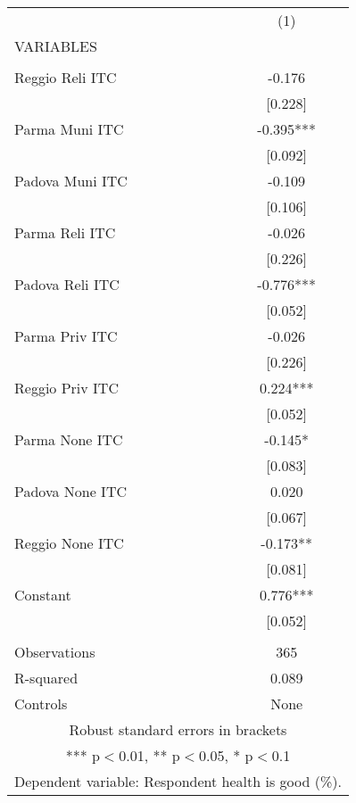 \begin{tabular}{lc} \hline
 & (1) \\
VARIABLES &  \\ \hline
 &  \\
Reggio Reli ITC & -0.176 \\
 & [0.228] \\
Parma Muni ITC & -0.395*** \\
 & [0.092] \\
Padova Muni ITC & -0.109 \\
 & [0.106] \\
Parma Reli ITC & -0.026 \\
 & [0.226] \\
Padova Reli ITC & -0.776*** \\
 & [0.052] \\
Parma Priv ITC & -0.026 \\
 & [0.226] \\
Reggio Priv ITC & 0.224*** \\
 & [0.052] \\
Parma None ITC & -0.145* \\
 & [0.083] \\
Padova None ITC & 0.020 \\
 & [0.067] \\
Reggio None ITC & -0.173** \\
 & [0.081] \\
Constant & 0.776*** \\
 & [0.052] \\
 &  \\
Observations & 365 \\
R-squared & 0.089 \\
 Controls & None \\ \hline
\multicolumn{2}{c}{ Robust standard errors in brackets} \\
\multicolumn{2}{c}{ *** p$<$0.01, ** p$<$0.05, * p$<$0.1} \\
\multicolumn{2}{c}{ Dependent variable: Respondent health is good (\%).} \\
\end{tabular}

